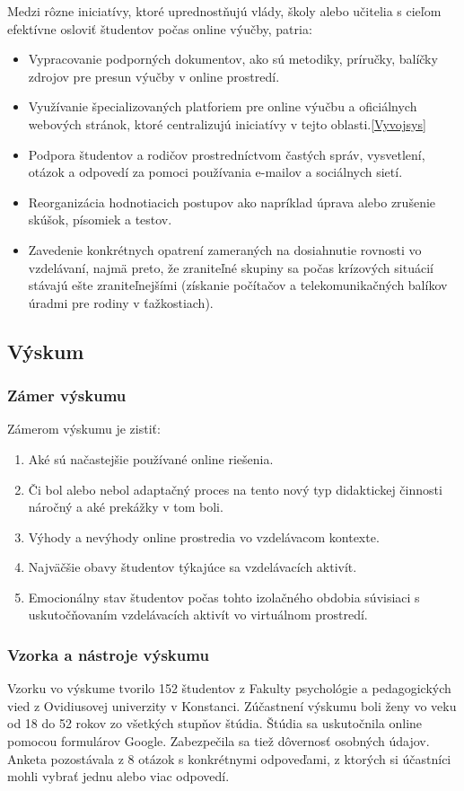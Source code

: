 \documentclass[10pt,oneside,slovak,a4paper]{article}
\begin{document}
Medzi rôzne iniciatívy, ktoré uprednostňujú vlády, školy alebo učitelia s cieľom efektívne osloviť študentov počas online výučby, patria:
\begin{itemize}
	\item Vypracovanie podporných dokumentov, ako sú metodiky, príručky, balíčky zdrojov pre presun výučby v online prostredí.
	\item Využívanie špecializovaných platforiem pre online výučbu  a oficiálnych webových stránok, ktoré centralizujú iniciatívy v tejto oblasti.\ref{Vyvojsys}%
	\item Podpora študentov a rodičov prostredníctvom častých správ, vysvetlení, otázok a odpovedí za pomoci používania e-mailov a sociálnych sietí.
	\item Reorganizácia hodnotiacich postupov ako napríklad úprava alebo zrušenie skúšok, písomiek a testov.
	\item Zavedenie konkrétnych opatrení zameraných na dosiahnutie rovnosti vo vzdelávaní, najmä preto, že zraniteľné skupiny sa počas krízových situácií stávajú ešte zraniteľnejšími (získanie počítačov a telekomunikačných balíkov úradmi pre rodiny v ťažkostiach).
\end{itemize}

\subsection{Výskum}%
\subsubsection{Zámer výskumu}
Zámerom výskumu je zistiť\cite{covid19}:
\begin{enumerate}
	\item Aké sú načastejšie používané online riešenia.
	\item Či bol alebo nebol adaptačný proces na tento nový typ didaktickej činnosti náročný a aké prekážky v tom boli.
	\item Výhody a nevýhody online prostredia vo vzdelávacom kontexte.
	\item Najväčšie obavy študentov týkajúce sa vzdelávacích aktivít. %
	\item Emocionálny stav študentov počas tohto izolačného obdobia súvisiaci s uskutočňovaním vzdelávacích aktivít vo virtuálnom prostredí.
\end{enumerate}
\subsubsection{Vzorka a nástroje výskumu}
Vzorku vo výskume tvorilo 152 študentov z Fakulty psychológie a pedagogických vied z Ovidiusovej univerzity v Konstanci.\cite{covid19}
Zúčastnení výskumu boli ženy vo veku od 18 do 52 rokov zo všetkých stupňov štúdia.
Štúdia sa uskutočnila online pomocou formulárov Google. Zabezpečila sa tiež dôvernosť osobných údajov.
Anketa pozostávala z 8 otázok s konkrétnymi odpoveďami, z ktorých si účastníci mohli vybrať jednu alebo viac odpovedí.
\end{document}
